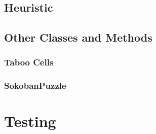 \documentclass[a4paper,12pt]{article}
\begin{document}
\subsection{Heuristic}
\subsection{Other Classes and Methods}
\subsubsection{Taboo Cells}
\subsubsection{SokobanPuzzle}

\section{Testing}
\end{document}

